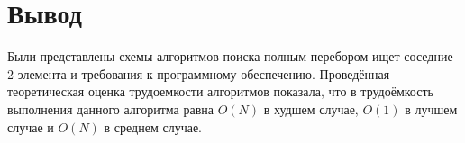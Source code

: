 \section*{Вывод}
Были представлены схемы алгоритмов поиска полным перебором ищет соседние 2 элемента и требования к программному обеспечению.
Проведённая теоретическая оценка трудоемкости алгоритмов показала, что в трудоёмкость выполнения данного алгоритма равна $O(N)$ в худшем случае, $O(1)$ в лучшем случае и $O(N)$ в среднем случае.